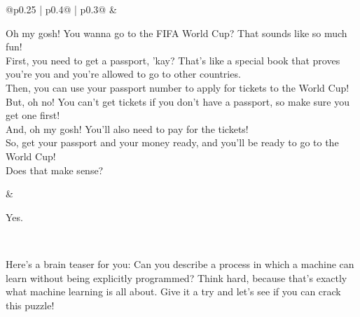 \begin{table}[!ht]
\begin{tabular}{@{}p{0.25\textwidth} | p{0.4\textwidth}@{} | p{0.3\textwidth}@{}}
 & 
\begin{minipage}[t]{\linewidth}%
\raggedright
{\footnotesize 
Oh my gosh! You wanna go to the FIFA World Cup? That sounds like so much fun! \\ First, you need to get a passport, 'kay? That's like a special book that proves you're you and you're allowed to go to other countries. \\Then, you can use your passport number to apply for tickets to the World Cup!  But, oh no! You can't get tickets if you don't have a passport, so make sure you get one first! \\ And, oh my gosh! You'll also need to pay for the tickets! \\ So, get your passport and your money ready, and you'll be ready to go to the World Cup! \\Does that make sense?
}
\end{minipage}
& 
\begin{minipage}[t]{\linewidth}%
\raggedright
{\footnotesize Yes.}
\end{minipage} \\

\midrule

\begin{minipage}[t]{\linewidth}%
\raggedright
{\footnotesize 
Here's a brain teaser for you: Can you describe a process in which a machine can learn without being explicitly programmed? Think hard, because that's exactly what machine learning is all about. Give it a try and let's see if you can crack this puzzle!
}
\end{minipage}
 

\end{tabular}
\end{table}
